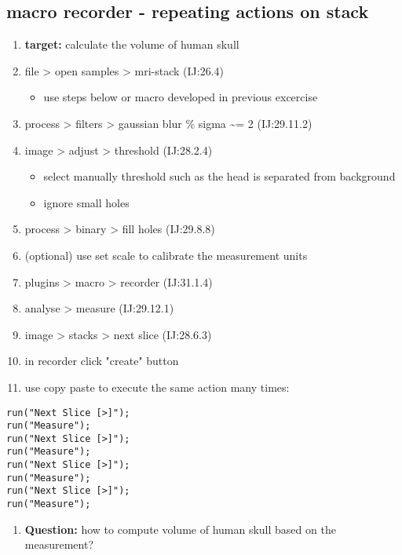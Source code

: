 \documentclass[11pt]{article}
\begin{document}
\subsection{macro recorder - repeating actions on stack}
\label{sec-7-2}
\begin{enumerate}
\item \textbf{target:} calculate the volume of human skull
\item file > open samples > mri-stack (IJ:26.4)
\begin{itemize}
\item use steps below or macro developed in previous excercise
\end{itemize}
\item process > filters > gaussian blur \% sigma \textasciitilde{}= 2 (IJ:29.11.2)
\item image > adjust > threshold (IJ:28.2.4)
\begin{itemize}
\item select manually threshold such as the head is separated from background
\item ignore small holes
\end{itemize}
\item process > binary > fill holes (IJ:29.8.8)
\item (optional) use set scale to calibrate the measurement units
\item plugins > macro > recorder (IJ:31.1.4)
\item analyse > measure (IJ:29.12.1)
\item image > stacks > next slice (IJ:28.6.3)
\item in recorder click "create" button
\item use copy paste to execute the same action many times:
\end{enumerate}
\begin{verbatim}
run("Next Slice [>]");
run("Measure");
run("Next Slice [>]");
run("Measure");
run("Next Slice [>]");
run("Measure");
run("Next Slice [>]");
run("Measure");
\end{verbatim}
\begin{enumerate}
\item \textbf{Question:} how to compute volume of human skull based on the measurement?
\end{enumerate}
\end{document}

